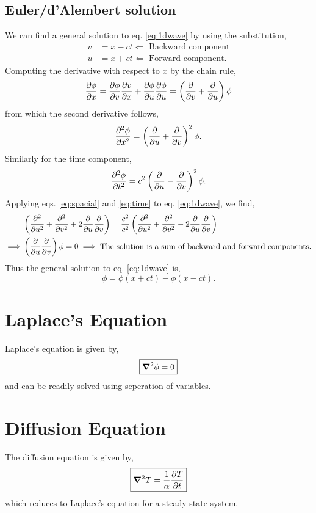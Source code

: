 \documentclass{book}
\begin{document}
\subsection{Euler/d'Alembert solution}
We can find a general solution to eq. \eqref{eq:1dwave} by using the substitution,
\begin{align}
	v & = x - ct \Leftarrow \text{ Backward component}\label{eq:backward}\\
	u & = x + ct \Leftarrow \text{ Forward component}\label{eq:forward}.
\end{align}
Computing the derivative with respect to $x$ by the chain rule,
\begin{equation}
	\pdv{\phi}{x} = \pdv{\phi}{v}\pdv{v}{x} + \pdv{\phi}{u}\pdv{\phi}{u} = \left(\pdv{v} + \pdv{u}\right)\phi
\end{equation}
from which the second derivative follows,
\begin{equation}
	\pdv[2]{\phi}{x} = \left(\pdv{u}+\pdv{v}\right)^2\phi. \label{eq:spacial}
\end{equation}
Similarly for the time component,
\begin{equation}
	\pdv[2]{\phi}{t} = c^2\left(\pdv{u}-\pdv{v}\right)^2\phi. \label{eq:time}
\end{equation}
Applying eqs. \eqref{eq:spacial} and \eqref{eq:time} to eq. \eqref{eq:1dwave}, we find,
\begin{equation}
	\begin{split}
		& \left(\pdv[2]{u} + \pdv[2]{v} + 2\pdv{u}\pdv{v}\right) = \frac{c^2}{c^2}\left(\pdv[2]{u} + \pdv[2]{v} - 2\pdv{u}\pdv{v}\right) \\
		\implies & \left(\pdv{u}\pdv{v}\right)\phi = 0 \implies \text{The solution is a sum of backward and forward components.}
	\end{split}
\end{equation}
Thus the general solution to eq. \eqref{eq:1dwave} is,
\begin{equation}
	\boxed{\phi = \phi(x + ct) - \phi(x-ct)}.
\end{equation}

\section{Laplace's Equation}
Laplace's equation is given by,
\begin{equation}
	\boxed{\grad^2\phi = 0}
\end{equation}
and can be readily solved using seperation of variables.
\section{Diffusion Equation}
The diffusion equation is given by,
\begin{equation}
	\boxed{\grad^2T = \frac{1}{\alpha}\pdv{T}{t}}
\end{equation}
which reduces to Laplace's equation for a steady-state system.
\end{document}
